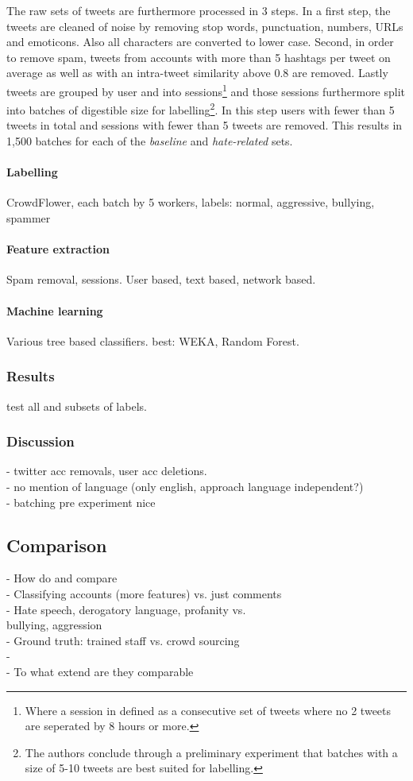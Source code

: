 \documentclass{proseminar}
\begin{document}
The raw sets of tweets are furthermore processed in 3 steps. In a first step, the tweets are cleaned of noise by removing stop words, punctuation, numbers, URLs and emoticons. Also all characters are converted to lower case. Second, in order to remove spam, tweets from accounts with more than 5 hashtags per tweet on average as well as with an intra-tweet similarity above 0.8 are removed. Lastly tweets are grouped by user and into sessions\footnote{Where a session in defined as a consecutive set of tweets where no 2 tweets are seperated by 8 hours or more.} and those sessions furthermore split into batches of digestible size for labelling\footnote{The authors conclude through a preliminary experiment that batches with a size of 5-10 tweets are best suited for labelling.}. In this step users with fewer than 5 tweets in total and sessions with fewer than 5 tweets are removed. This results in 1,500 batches for each of the \emph{baseline} and \emph{hate-related} sets.

\paragraph{Labelling} CrowdFlower, each batch by 5 workers, labels: normal, aggressive, bullying, spammer
\paragraph{Feature extraction} Spam removal, sessions. User based, text based, network based.
\paragraph{Machine learning} Various tree based classifiers. best: WEKA, Random Forest.
\subsubsection{Results} test all and subsets of labels.
\subsubsection{Discussion} - twitter acc removals, user acc deletions.\\
- no mention of language (only english, approach language independent?)\\
- batching pre experiment nice

\subsection{Comparison}
- How do \cite{Yahoo:2016} and \cite{Twitter:2017} compare\\
\hphantom{- }- Classifying accounts (more features) vs. just comments\\
\hphantom{- }- Hate speech, derogatory language, profanity vs.\\
\hphantom{- - }bullying, aggression\\
\hphantom{- }- Ground truth: trained staff vs. crowd sourcing\\
\hphantom{- }- \\
- To what extend are they comparable
\end{document}
